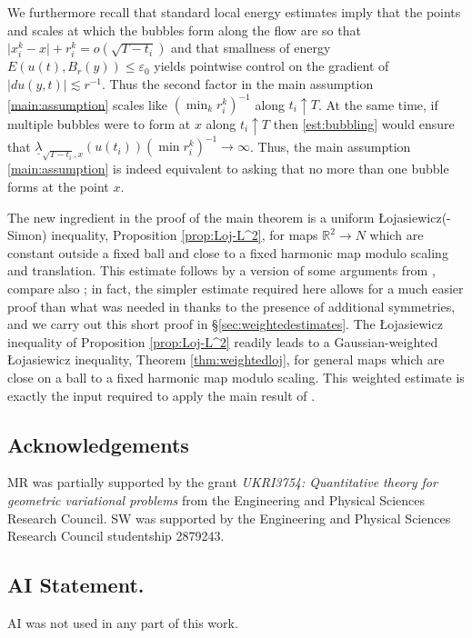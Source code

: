 \documentclass[10pt,reqno]{amsart}
\theoremstyle{plain}
\theoremstyle{definition}
\numberwithin{equation}{section}
\newcommand{\R}{\ensuremath{{\mathbb R}}}
\newcommand{\upto}{\uparrow}
\newcommand{\leqs}{\lesssim}
\newcommand{\abs}[1]{\vert#1\vert}
\newcommand{\eps}{\varepsilon}
\begin{document}
We furthermore recall that standard local energy estimates imply that the points and scales at which the bubbles form along the flow are so that $\abs{x_i^k-x}+r_i^k=o(\sqrt{T-t_i})$ and that smallness of energy $E(u(t),B_r(y))\leq \eps_0 $
 yields pointwise control on the gradient of $\abs{du(y,t)}\leqs r^{-1}$. 
Thus the second factor in the main assumption \eqref{main:assumption}  scales like $(\min_k r_i^k)^{-1}$ along $t_i\upto T$. At the same time, if multiple bubbles were to form at $x$ along $t_i\upto T$  then \eqref{est:bubbling} would ensure that $\underline{\lambda}_{\sqrt{T - t_i}, x}(u(t_i))(\min r_i^k)^{-1}\to \infty$. Thus, the main assumption \eqref{main:assumption} is indeed equivalent to asking that no more than one bubble forms at the point $x$.

The new ingredient in the proof of the main theorem is a uniform \L ojasiewicz(-Simon) inequality, Proposition \ref{prop:Loj-L^2}, for maps $\R^2 \to N$ which are constant outside a fixed ball and close to a fixed harmonic map modulo scaling and translation. This estimate follows by a version of some arguments from \cite{rupflinharmonic}, compare also \cite{malchiodirupflinsharp}; in fact, the simpler estimate required here allows for a much easier proof than what was needed in \cite{malchiodirupflinsharp,rupflinharmonic} thanks to the presence of additional symmetries, and we carry out this short proof in \S \ref{sec:weightedestimates}. The \L ojasiewicz inequality of Proposition \ref{prop:Loj-L^2} readily leads to a Gaussian-weighted \L ojasiewicz inequality, Theorem \ref{thm:weightedloj}, for general maps which are close on a ball to a fixed harmonic map modulo scaling. This weighted estimate is exactly the input required to apply the main result of \cite{waldronweighted}.

\subsection*{Acknowledgements}
MR was partially supported by the grant \textit{UKRI3754: Quantitative theory for geometric variational problems}
from the Engineering and Physical Sciences Research
Council. 
SW was supported by the Engineering and Physical Sciences Research
Council studentship 2879243.



\subsection*{AI Statement.} AI was not used in any part of this work. 
\end{document}

